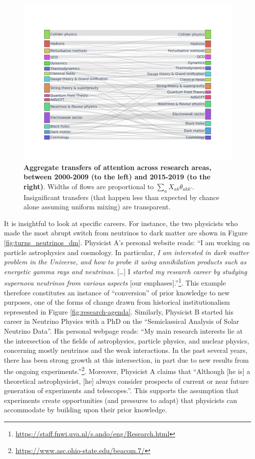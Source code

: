 \documentclass{article}
\begin{document}
 \begin{figure}[h]
     \centering
     \includegraphics[width=\textwidth]{plots/sankey_control_nu.pdf}
     \caption{\textbf{Aggregate transfers of attention across research areas, between 2000-2009 (to the left) and 2015-2019 (to the right)}. Widths of flows are proportional to $\sum_a X_{ak}\theta_{akk'}$. Insignificant transfers (that happen less than expected by chance alone assuming uniform mixing) are transparent. }
     \label{fig:sankey}
 \end{figure}

It is insightful to look at specific careers. For instance, the two physicists who made the most abrupt switch from neutrinos to dark matter are shown in Figure \ref{fig:turns_neutrinos_dm}. Physicist A's personal website reads: ``I am working on particle astrophysics and cosmology. In particular, \textit{I am interested in dark matter problem in the Universe, and how to probe it using annihilation products such as energetic gamma rays and neutrinos}. [\dots]  I \textit{started my research career by studying supernova neutrinos from various aspects} [our emphases].''\footnote{\url{https://staff.fnwi.uva.nl/s.ando/eng/Research.html}}. This example therefore constitutes an instance of ``conversion'' of prior knowledge to new purposes, one of the forms of change drawn from historical institutionalism represented in Figure \ref{fig:research-agenda}. Similarly, Physicist B started his career in Neutrino Physics with a PhD on the ``Semiclassical Analysis of Solar Neutrino Data''.  His personal webpage reads: ``My main research interests lie at the intersection of the fields of astrophysics, particle physics, and nuclear physics, concerning mostly neutrinos and the weak interactions. In the past several years, there has been strong growth at this intersection, in part due to new results from the ongoing experiments.''\footnote{\url{https://www.asc.ohio-state.edu/beacom.7/}}. Moreover, Physicist A claims that ``Although [he is] a theoretical astrophysicist, [he] always consider prospects of current or near future generation of experiments and telescopes.''. This supports the assumption that experiments create opportunities (and pressures to adapt) that physicists can accommodate by building upon their prior knowledge. 
\end{document}
